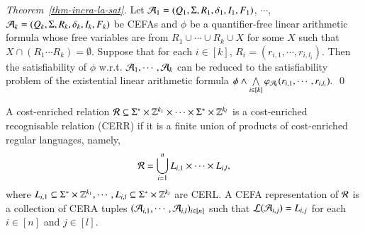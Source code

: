 \begin{proof}[Theorem~\ref{thm-incra-la-sat}]
Let $\mathcal{A}_1=(Q_1, \Sigma, R_1, \delta_1, I_1, F_1)$, $\cdots$, $\mathcal{A}_k=(Q_k, \Sigma, R_k, \delta_k, I_k, F_k)$ be CEFAs and $\phi$ be a quantifier-free linear arithmetic formula whose free variables are from  $R_1 \cup \cdots \cup R_k \cup X$ for some $X$ such that $X \cap (R_1 \cdots R_k) = \emptyset$.
Suppose that for each $i \in [k]$, $R_i = (r_{i, 1}, \cdots, r_{i, l_i})$. Then the satisfiability of $\phi$ w.r.t. $\mathcal{A}_1,\cdots, \mathcal{A}_k$ can be reduced to the satisfiability problem of the  existential linear arithmetic formula
$
\phi \wedge \bigwedge \limits_{i \in [k]} \varphi_{\mathcal{A}_i}(r_{i,1}, \cdots, r_{i, l_i}).
$
\qed
\end{proof}

\begin{definition}
A cost-enriched relation $\mathcal{R} \subseteq \Sigma^* \times \mathbb{Z}^{k_1} \times \cdots  \times \Sigma^* \times \mathbb{Z}^{k_l}$ is a cost-enriched recognisable relation (CERR)  if it is a finite union of products of cost-enriched regular languages, namely, 
\[\mathcal{R} = \bigcup \limits_{i=1}^n L_{i,1 } \times \cdots \times L_{i, l},\]
where $L_{i,1} \subseteq \Sigma^* \times \mathbb{Z}^{k_1}, \cdots, L_{i, l} \subseteq \Sigma^* \times \mathbb{Z}^{k_l}$ are CERL. 
A CEFA representation of $\mathcal{R}$ is a collection of CERA tuples $(\mathcal{A}_{i,1}, \cdots, \mathcal{A}_{i,l})_{i \in [n]}$ such that $\mathcal{L}(\mathcal{A}_{i,j}) = L_{i,j}$ for each $i \in [n]$ and $j \in [l]$.
\end{definition}




